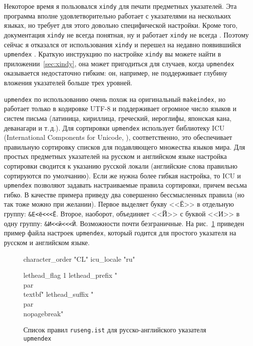 \documentclass[a4paper,12pt,hyphens]{article}
\newcommand\exe[1]{\texttt{#1}}
\newcommand\file[1]{\texttt{#1}}
\begin{document}
Некоторое время я пользовался \exe{xindy} \parencite{ctan-xindy} для печати предметных указателей. Эта программа
вполне удовлетворительно работает с указателями на нескольких языках, но требует для этого довольно специфической настройки.
Кроме того, документация \exe{xindy} не всегда понятная, ну и работает \exe{xindy} не всегда \parencite{se-xindy}.
Поэтому сейчас я отказался от использования \exe{xindy} и перешел на недавно появившийся \exe{upmendex} \parencite{ctan-upmendex}. Краткую инструкцию по настройке \exe{xindy} вы можете найти в приложении~\ref{sec:xindy}, она может пригодиться для случаев, когда \exe{upmendex} оказывается недостаточно гибким: он, например, не поддерживает глубину вложения указателей больше трех уровней.

\exe{upmendex} по использованию очень похож на оригинальный \exe{makeindex}, но работает только в кодировке UTF-8
и поддерживает огромное число языков и систем письма (латиница, кириллица, греческий, иероглифы, японская кана, деванагари и т.\,д.).
Для сортировки \exe{upmendex} использует библиотеку ICU (International Components for Unicode, \parencite{site-icu}),
соответственно, это обеспечивает правильную сортировку списков для подавляющего множества языков мира. Для простых
предметных указателей на русском и английском языке настройка сортировки сводится к указанию русской локали (английские
слова правильно сортируются по умолчанию). Если же нужна более гибкая настройка, то ICU и \exe{upmendex} позволяют
задавать настраиваемые правила сортировки, причем весьма гибко. В качестве примера приведу два совершенно бессмысленных
правила (но так тоже можно при желании). Первое выделяет букву <<Ё>> в отдельную группу: \texttt{\&Е<ё<<<Ё}. Второе, наоборот,
объединяет <<Й>> с буквой <<И>> в одну группу: \texttt{\&И<<й<<<Й}. Возможности почти безграничные.
На рис.~\ref{upmendex1} приведен пример файла настроек \exe{upmendex}, который годится для простого указателя на русском и английском языке.
\begin{figure}[tp]
\begin{istcode}
character_order "CL"
icu_locale "ru"

lethead_flag 1
lethead_prefix "\n  \\par\\textbf{"
lethead_suffix  "}\\par\\nopagebreak"
\end{istcode}
\caption{Список правил \file{ruseng.ist} для русско-английского указателя
\exe{upmendex}}\label{upmendex1}
\end{figure}
\end{document}
